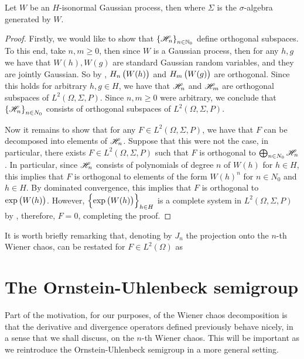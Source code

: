 \documentclass[../main.tex]{subfiles}
\begin{document}
\begin{theorem}
\label{the:wiener_chaos}
Let $W$ be an $H$-isonormal Gaussian process, then  where $\Sigma$ is the $\sigma$-algebra generated by $W$.
\end{theorem}
\begin{proof}
Firstly, we would like to show that $\cbr{\Wie_n}_{n\in\N_0}$ define orthogonal subspaces. To this end, take $n,m\geq 0$, then since $W$ is a Gaussian process, then for any $h,g$ we have that $W(h),W(g)$ are standard Gaussian random variables, and they are jointly Gaussian. So by , $H_n\del{W(h)}$ and $H_m\del{W(g)}$ are orthogonal. Since this holds for arbitrary $h,g\in H$, we have that $\mathscr{H}_n$ and $\mathscr{H}_m$ are orthogonal subspaces of $L^2(\Omega,\Sigma,P)$. Since $n,m\geq0$ were arbitrary, we conclude that $\cbr{\Wie_n}_{n\in N_0}$ consists of orthogonal subspaces of $L^2(\Omega,\Sigma,P)$.

Now it remains to show that for any $F\in L^2(\Omega,\Sigma,P)$, we have that $F$ can be decomposed into elements  of $\mathscr{H}_n$. Suppose that this were not the case, in particular, there exists $F\in L^2(\Omega,\Sigma,P)$ such that $F$ is orthogonal to $\bigoplus_{n\in N_0}\mathscr{H}_n$. In particular, since $\mathscr{H}_n$ consists of polynomials of degree $n$ of $W(h)$ for $h\in H$, this implies that $F$ is orthogonal to elements of the form $W(h)^n$ for $n\in N_0$ and $h\in H$. By dominated convergence, this implies that $F$ is orthogonal to $\exp\del{W(h)}$. However, $\cbr{\exp\del{W(h)}}_{h\in H}$ is a complete system in $L^2(\Omega,\Sigma,P)$ by , therefore, $F=0$, completing the proof.
\end{proof}

It is worth briefly remarking that, denoting by $J_n$ the projection onto the $n$-th Wiener chaos,  can be restated for $F\in L^2(\Omega)$ as 

\section{The Ornstein-Uhlenbeck semigroup}
Part of the motivation, for our purposes, of the Wiener chaos decomposition is that the derivative and divergence operators defined previously behave nicely, in a sense that we shall discuss, on the $n$-th Wiener chaos. This will be important as we reintroduce the Ornstein-Uhlenbeck semigroup in a more general setting.
\end{document}
